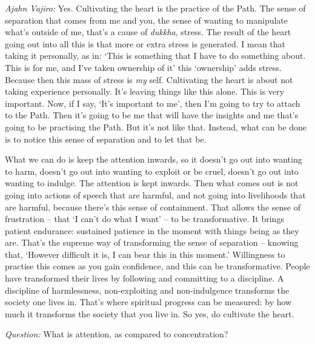 \emph{Ajahn Vajiro:} Yes. Cultivating the heart is the practice of the Path. The sense
of separation that comes from me and you, the sense of wanting to manipulate
what's outside of me, that's a cause of \emph{dukkha}, stress. The result of the
heart going out into all this is that more or extra stress is generated. I mean that
taking it personally, as in: `This is something that I have to do something
about. This is for me, and I've taken ownership of it' this `ownership' adds
stress. Because then this mass of stress is \emph{my} self. Cultivating the
heart is about not taking experience personally. It's leaving things like this
alone. This is very important. Now, if I say, `It's important to me', then I'm
going to try to attach to the Path. Then it's going to be me that will have the
insights and me that's going to be practising the Path. But it's not like that.
Instead, what can be done is to notice this sense of separation and to let that
be.

What we can do is keep the attention inwards, so it doesn't go out into wanting
to harm, doesn't go out into wanting to exploit or be cruel, doesn't go out into
wanting to indulge. The attention is kept inwards. Then what comes out is not
going into actions of speech that are harmful, and not going into livelihoods
that are harmful, because there's this sense of containment. That allows the
sense of frustration -- that `I can't do what I want' -- to be transformative.
It brings patient endurance: sustained patience in the moment with things being as they
are. That's the supreme way of transforming the sense of separation -- knowing
that, `However difficult it is, I can bear this in this moment.' Willingness to
practise this comes as you gain confidence, and this can be transformative.
People have transformed their lives by following and committing to a discipline.
A discipline of harmlessness, non-exploiting and non-indulgence transforms the
society one lives in. That's where spiritual progress can be measured: by how
much it transforms the society that you live in. So yes, do cultivate the heart.

\bigskip

\emph{Question:} What is attention, as compared to concentration?

